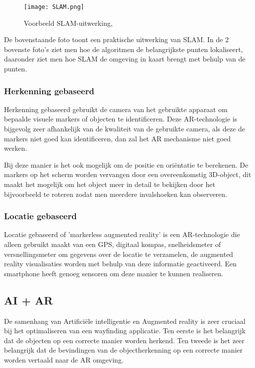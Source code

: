 \begin{figure}[H]
	\centering
	\texttt{[image: SLAM.png]}
	\caption{Voorbeeld SLAM-uitwerking, \autocite{AVRSpot2018}}
\end{figure}

De bovenstaande foto toont een praktische uitwerking van SLAM. In de 2 bovenste foto's ziet men hoe de algoritmen de belangrijkste punten lokaliseert, daaronder ziet men hoe SLAM de omgeving in kaart brengt met behulp van de punten.

\pagebreak
\subsubsection{Herkenning gebaseerd}
Herkenning gebaseerd gebruikt de camera van het gebruikte apparaat om bepaalde visuele markers of objecten te identificeren. Deze AR-technologie is bijgevolg zeer afhankelijk van de kwaliteit van de gebruikte camera, als deze de markers niet goed kan identificeren, dan zal het AR mechanisme niet goed werken. \autocite{NewGenApps2017}

Bij deze manier is het ook mogelijk om de positie en oriëntatie te berekenen. De markers op het scherm worden vervangen door een overeenkomstig 3D-object, dit maakt het mogelijk om het object meer in detail te bekijken door het bijvoorbeeld te roteren zodat men meerdere invalshoeken kan observeren.

\subsubsection{Locatie gebaseerd}
Locatie gebaseerd of 'markerless augmented reality' is een AR-technologie die alleen gebruikt maakt van een GPS, digitaal kompas, snelheidsmeter of versnellingsmeter om gegevens over de locatie te verzamelen, de augmented reality visualisaties worden met behulp van deze informatie geactiveerd. Een smartphone heeft genoeg sensoren om deze manier te kunnen realiseren. \autocite{NewGenApps2017}

\subsection{AI + AR}
De samenhang van Artificiële intelligentie en Augmented reality is zeer cruciaal bij het optimaliseren van een wayfinding applicatie. Ten eerste is het belangrijk dat de objecten op een correcte manier worden herkend. Ten tweede is het zeer belangrijk dat de bevindingen van de objectherkenning op een correcte manier worden vertaald naar de AR omgeving. 
\newpage
